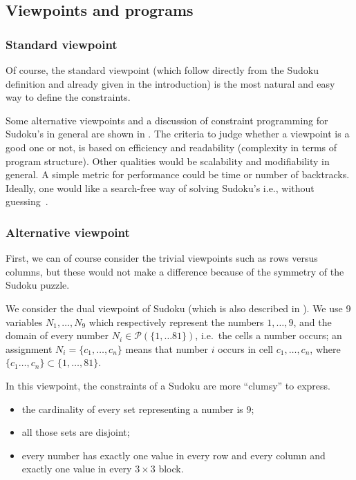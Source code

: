 \subsection{Viewpoints and programs}
\subsubsection{Standard viewpoint}
Of course, the standard viewpoint (which follow directly from the Sudoku definition and already given in the introduction) is the most natural and easy way to define the constraints. 

Some alternative viewpoints and a discussion of constraint programming for Sudoku's in general are shown in \cite{sudoku_constraint}. The criteria to judge whether a viewpoint is a good one or not, is based on efficiency and readability (complexity in terms of program structure). Other qualities would be scalability and modifiability in general. A simple metric for performance could be time or number of backtracks. Ideally, one would like a search-free way of solving Sudoku's i.e., without guessing~\cite{sudoku_constraint}.


\subsubsection{Alternative viewpoint}
First, we can of course consider the trivial viewpoints such as rows versus columns, but these would not make a difference because of the symmetry of the Sudoku puzzle.

We consider the dual viewpoint of Sudoku (which is also described in \cite{sudokualt}). We use 9 variables $N_1,\ldots, N_9$ which respectively represent the numbers $1,\ldots, 9$, and the domain of every number $N_i \in \mathcal{P}(\{1,\ldots 81\})$, i.e.~the cells a number occurs; an assignment $N_i = \{ c_1, \ldots, c_n\}$ means that number $i$ occurs in cell $c_1, \ldots, c_n$, where $\{ c_1 \ldots , c_n \} \subset \{1,\ldots , 81\}$.

In this viewpoint, the constraints of a Sudoku are more ``clumsy'' to express.
\begin{itemize}
 \item the cardinality of every set representing a number is 9;
 \item all those sets are disjoint;
 \item every number has exactly one value in every row and every column and exactly one value in every $3 \times 3$ block. 
\end{itemize}

